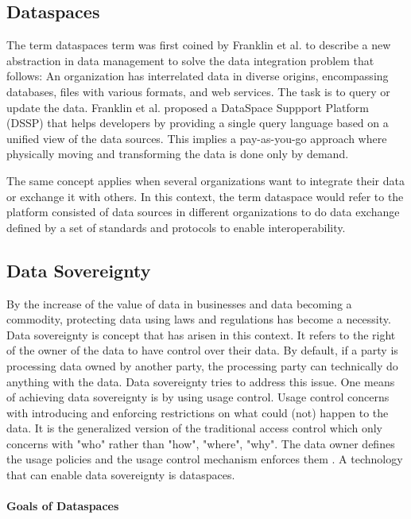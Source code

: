 \subsection{Dataspaces}
The term dataspaces term was first coined by Franklin et al. \cite{franklin_databases_2005} to describe a new abstraction in data management to solve the data integration problem that follows: An organization has interrelated data in diverse origins, encompassing databases, files with various formats, and web services. The task is to query or update the data.
Franklin et al. proposed a DataSpace Suppport Platform (DSSP) that helps developers by providing a single query language based on a unified view of the data sources. This implies a pay-as-you-go approach where physically moving and transforming the data is done only by demand.

The same concept applies when several organizations want to integrate their data or exchange it with others. In this context, the term dataspace would refer to the platform consisted of data sources in different organizations to do data exchange defined by a set of standards and protocols to enable interoperability. \cite{reiberg_what_2022}

\subsection{Data Sovereignty}
By the increase of the value of data in businesses and data becoming a commodity, protecting data using laws and regulations has become a necessity. Data sovereignty is concept that has arisen in this context. It refers to the right of the owner of the data to have control over their data. By default, if a party is processing data owned by another party, the processing party can technically do anything with the data. Data sovereignty tries to address this issue. One means of achieving data sovereignty is by using usage control. Usage control concerns with introducing and enforcing restrictions on what could (not) happen to the data. It is the generalized version of the traditional access control which only concerns with "who" rather than "how", "where", "why". The data owner defines the usage policies and the usage control mechanism enforces them \cite{eitel_usage_2021}. A technology that can enable data sovereignty is dataspaces.

\paragraph{Goals of Dataspaces}

